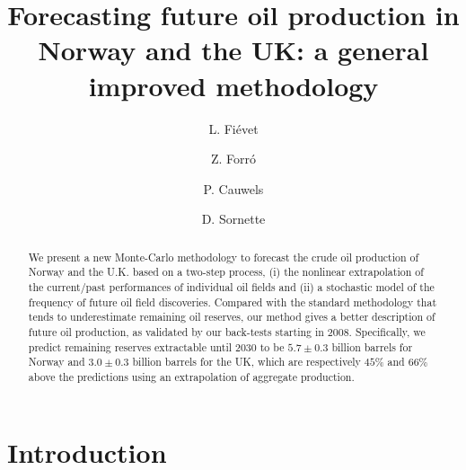 \documentclass[review]{elsarticle}
\begin{document}
\thispagestyle{fancy} 


\title{Forecasting future oil production in Norway and the UK: a general improved methodology}

\author[eth-mtec]{L. Fi\'evet}

\author[eth-mtec]{Z. Forr\'o}

\author[eth-mtec]{P. Cauwels}

\author[eth-mtec]{D. Sornette}


\address[eth-mtec]{Chair of Entrepreneurial Risks, ETH Z\"urich, Scheuchzerstrasse 7 (SEC F), CH-8092 Z\"urich, Switzerland}


\maketitle
\begin{abstract}
\noindent We present a new Monte-Carlo methodology to forecast
the crude oil production of Norway and the U.K. based on a two-step process,
(i) the nonlinear extrapolation of the current/past
performances of individual oil fields and (ii) a stochastic model
of the frequency of future oil field discoveries. Compared
with the standard methodology that tends to underestimate remaining oil reserves,
our method gives a better description of future oil production, as validated by
our back-tests starting in 2008. Specifically, we predict remaining reserves
extractable until 2030 to be $5.7 \pm 0.3$ billion barrels for Norway and $3.0 \pm0.3$ billion barrels for the UK, which are respectively $45\%$ and $66\%$ above the predictions using an extrapolation of aggregate production.
\end{abstract}

\section{Introduction}
\end{document}
